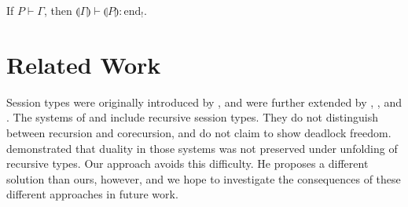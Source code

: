 \documentclass[orivec,envcountsame]{llncs}
\newcommand{\cpdual}[1]{#1^\perp}
\newcommand{\gvdual}[1]{\overline{#1}}
\newcommand{\gvout}[2]{{!#1.#2}}
\newcommand{\outterm}{\mathrm{end}_!}
\newcommand{\gvservice}[1]{\sharp #1}
\newcommand{\cptyp}[2]{#1 \vdash #2}
\newcommand{\gvtyp}[3]{#1 \vdash #2 : #3}
\newcommand{\mapname}{\mathsf{map}}
\newcommand{\gvmap}[3]{\mapname^{#1}_{#2}\:#3}
\newcommand{\mkwd}[1]{\mathsf{#1}}
\newcommand{\gvsend}[2]{\mkwd{send}\:#1\:#2}
\newcommand{\gvlet}[3]{\mkwd{let}\;#1 = #2\;\mkwd{in}\;#3}
\newcommand{\gvfork}[2]{\mkwd{fork}\:#1.#2}
\newcommand{\lrkwd}{\mkwd{cofix}}
\newcommand{\gvfix}[3]{\lrkwd\:#1\:#2 = #3}
\newcommand{\togv}[1]{\llparenthesis #1 \rrparenthesis}
\newcommand{\mucp}{$\mu\mathrm{CP}$\xspace}
\newcommand{\mugv}{$\mu\mathrm{GV}$\xspace}
\begin{document}
%







\begin{theorem}
  If $\cptyp{P}{\Gamma}$, then $\gvtyp{\togv{\Gamma}}{\togv{P}}{\outterm}$.
\end{theorem}

\section{Related Work}\label{sec:related}

Session types were originally introduced by \citet{Honda93}, and were further extended by
\citet{Takeuchi94}, \citet{Honda98}, and \citet{Yoshida07}.  The systems of \citet{Honda98} and
\citet{Yoshida07} include recursive session types.  They do not distinguish between recursion and
corecursion, and do not claim to show deadlock freedom.  \citet{Bernardi13} demonstrated that
duality in those systems was not preserved under unfolding of recursive types.  Our approach avoids
this difficulty.  He proposes a different solution than ours, however, and we hope to investigate
the consequences of these different approaches in future work.
\end{document}
